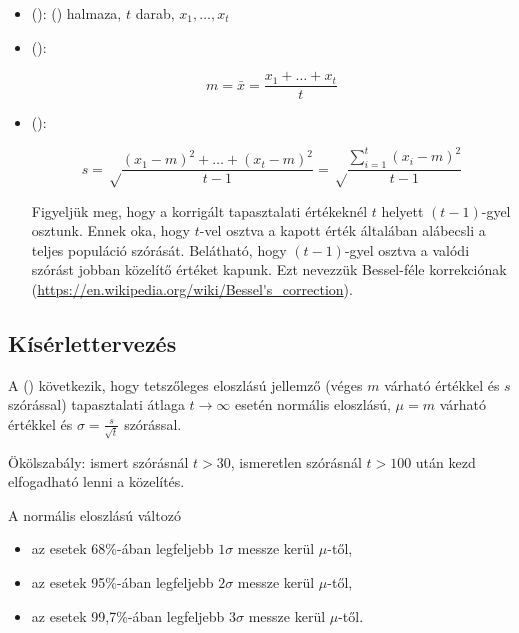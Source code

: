 \begin{definicio}
	\begin{itemize}
		\item {} ():  () halmaza, $t$ darab, $x_1, \dots, x_t$
		\item {} ():

		$$m = \bar{x} = \frac{x_1 + \dots + x_t}{t}$$

		\item {} ():

		$$s = \sqrt\frac{\left(x_1-m\right)^2 + \dots + \left(x_t-m\right)^2}{t-1} = \sqrt\frac{\sum_{i=1}^{t}\left(x_i - m\right)^2}{t-1}$$

		Figyeljük meg, hogy a korrigált tapasztalati értékeknél $t$ helyett $(t-1)$-gyel osztunk. Ennek oka, hogy $t$-vel osztva a kapott érték általában alábecsli a teljes populáció szórását. Belátható, hogy $(t-1)$-gyel osztva a valódi szórást jobban közelítő értéket kapunk. Ezt nevezzük Bessel-féle korrekciónak (\url{https://en.wikipedia.org/wiki/Bessel's\_correction}).
	\end{itemize}
\end{definicio}

\subsection{Kísérlettervezés}

A  () következik, hogy tetszőleges eloszlású jellemző (véges $m$ várható értékkel és $s$ szórással) tapasztalati átlaga $t \rightarrow \infty$ esetén normális eloszlású, $\mu = m$ várható értékkel és $\sigma = \frac{s}{\sqrt{t}}$ szórással.

Ökölszabály: ismert szórásnál $t > 30$, ismeretlen szórásnál $t > 100$ után kezd elfogadható lenni a közelítés.

A normális eloszlású változó
\begin{itemize}
	\item az esetek 68\%-ában legfeljebb $1\sigma$ messze kerül $\mu$-től,
	\item az esetek 95\%-ában legfeljebb $2\sigma$ messze kerül $\mu$-től,
	\item az esetek 99,7\%-ában legfeljebb $3\sigma$ messze kerül $\mu$-től.
\end{itemize}

